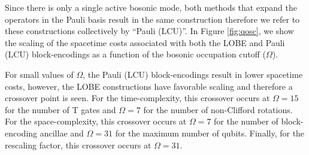 Since there is only a single active bosonic mode, both methods that expand the operators in the Pauli basis result in the same construction therefore we refer to these constructions collectively by ``Pauli (LCU)''.
In Figure \ref{fig:qosc}, we show the scaling of the spacetime costs associated with both the LOBE and Pauli (LCU) block-encodings as a function of the bosonic occupation cutoff ($\Omega$).

For small values of $\Omega$, the Pauli (LCU) block-encodings result in lower spacetime costs, however, the LOBE constructions have favorable scaling and therefore a crossover point is seen.
For the time-complexity, this crossover occurs at $\Omega = 15$ for the number of T gates and $\Omega = 7$ for the number of non-Clifford rotations.
For the space-complexity, this crossover occurs at $\Omega = 7$ for the number of block-encoding ancillae and $\Omega = 31$ for the maximum number of qubits.
Finally, for the rescaling factor, this crossover occurs at $\Omega = 31$.
